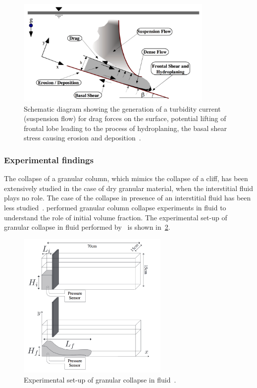\begin{figure}[tbhp]
\centering
\includegraphics[width=0.85\textwidth]{Submarine_landslide}
\caption[Complex interactions in a submarine landslide]{Schematic diagram 
showing the generation of a turbidity current (suspension flow) for drag forces 
on the surface, potential lifting of frontal lobe leading to the process of 
hydroplaning, the basal shear stress causing erosion and 
deposition~\citep{Locat2002}.}
\label{fig:Submarine_landslide}
\end{figure}

\subsubsection{Experimental findings}

The collapse of a granular column, which mimics the collapse of a cliff, has 
been extensively studied in the case of dry granular material, when the 
interstitial fluid plays no role. The case of the collapse in presence of an 
interstitial fluid has been less studied~\citep{Topin2012}. 
\citet{Rondon2011} performed granular column collapse experiments in fluid to 
understand the role of initial volume fraction. The experimental set-up 
of granular collapse in fluid performed by~\citet{Rondon2011} is shown 
in~\cref{fig:Fluid_Collapse}.

\begin{figure}[htbp]
\centering
\includegraphics[width=0.65\textwidth]{Fluid_Collapse}
\caption{Experimental set-up of granular collapse in fluid~\citep{Rondon2011}.}
\label{fig:Fluid_Collapse}
\end{figure}

